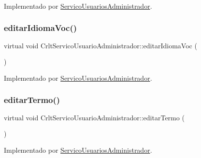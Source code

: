 Implementado por \mbox{\hyperlink{class_servico_usuarios_administrador_a57d5f777ed99a006dc2db5cdb0f135b1}{Servico\+Usuarios\+Administrador}}.

\mbox{\label{class_crlt_servico_usuario_administrador_adf459478defbc327815266343866a1ab}} 
\subsubsection{\texorpdfstring{editar\+Idioma\+Voc()}{editarIdiomaVoc()}}
{\footnotesize\ttfamily virtual void Crlt\+Servico\+Usuario\+Administrador\+::editar\+Idioma\+Voc (\begin{DoxyParamCaption}{ }\end{DoxyParamCaption})\hspace{0.3cm}{\ttfamily [pure virtual]}}



Implementado por \mbox{\hyperlink{class_servico_usuarios_administrador_ac0d400904b25cd30911a446bce66603a}{Servico\+Usuarios\+Administrador}}.

\mbox{\label{class_crlt_servico_usuario_administrador_a18da82fdae717b90254dbaa003ac14cb}} 
\subsubsection{\texorpdfstring{editar\+Termo()}{editarTermo()}}
{\footnotesize\ttfamily virtual void Crlt\+Servico\+Usuario\+Administrador\+::editar\+Termo (\begin{DoxyParamCaption}{ }\end{DoxyParamCaption})\hspace{0.3cm}{\ttfamily [pure virtual]}}



Implementado por \mbox{\hyperlink{class_servico_usuarios_administrador_a219b135060f3a85d996f506474b99f48}{Servico\+Usuarios\+Administrador}}.


